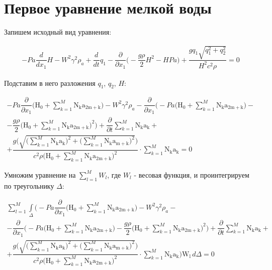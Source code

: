 \documentclass[14pt]{extreport}
\begin{document}
\section{Первое уравнение мелкой воды}

Запишем исходный вид уравнения:

\begin{multline*}
- Pa \dfrac{d}{d x_{1}} H - W^{2} \gamma^{2} \rho_{a} + \dfrac{d}{d t} q_{1} - \dfrac{\partial}{\partial x_{1}}\bigg(- \dfrac{g \rho}{2} H^{2} - H Pa\bigg) + \dfrac{g q_{1} \sqrt{q_{1}^{2} + q_{2}^{2}}}{H^{2} c^{2} \rho}=0
\end{multline*}

Подставим в него разложения $q_1$, $q_2$, $H$:

\begin{multline*}
- Pa \dfrac{\partial}{\partial x_{1}} \bigg(\operatorname{H_{0}} + \sum_{k=1}^{M} \operatorname{N_{k}} \operatorname{a_{2m+k}}\bigg) - W^{2} \gamma^{2} \rho_{a} - \dfrac{\partial}{\partial x_{1}}\bigg(- Pa \bigg(\operatorname{H_{0}} + \sum\limits_{k=1}^{M} \operatorname{N_{k}} \operatorname{a_{2m+k}}\bigg) -\\- \dfrac{g \rho}{2} \bigg(\operatorname{H_{0}} + \sum\limits_{k=1}^{M} \operatorname{N_{k}} \operatorname{a_{2m+k}}\bigg)^{2}\bigg) + \dfrac{\partial}{\partial t} \sum\limits_{k=1}^{M} \operatorname{N_{k}} \operatorname{a_{k}} +\\+ \dfrac{g \bigg(\sqrt{\bigg(\sum\limits_{k=1}^{M} \operatorname{N_{k}} \operatorname{a_{k}}\bigg)^{2} + \bigg(\sum\limits_{k=1}^{M} \operatorname{N_{k}} \operatorname{a_{m+k}}\bigg)^{2}}\bigg)}{c^{2} \rho \bigg(\operatorname{H_{0}} + \sum\limits_{k=1}^{M} \operatorname{N_{k}} \operatorname{a_{2m+k}}\bigg)^{2}} \cdot \sum\limits_{k=1}^{M} \operatorname{N_{k}} \operatorname{a_{k}} = 0
\end{multline*}

Умножим уравнение на $\sum\limits_{l=1}^{M} W_l$, где $W_l$ - весовая функция, и проинтегрируем по треугольнику $\Delta$:

\begin{multline*}
\sum_{l=1}^{M} \int\limits_{\Delta} \bigg(- Pa \dfrac{\partial}{\partial x_{1}}\bigg(\operatorname{H_{0}} + \sum_{k=1}^{M} \operatorname{N_{k}} \operatorname{a_{2m+k}}\bigg) - W^{2} \gamma^{2} \rho_{a} -\\- \dfrac{\partial}{\partial x_{1}}\bigg(- Pa \bigg(\operatorname{H_{0}} + \sum\limits_{k=1}^{M} \operatorname{N_{k}} \operatorname{a_{2m+k}}\bigg) - \dfrac{g \rho}{2} \bigg(\operatorname{H_{0}} + \sum_{k=1}^{M} \operatorname{N_{k}} \operatorname{a_{2m+k}}\bigg)^{2}\bigg) + \dfrac{\partial}{\partial t} \sum\limits_{k=1}^{M} \operatorname{N_{k}} \operatorname{a_{k}} +\\+ \dfrac{g \bigg(\sqrt{\bigg(\sum\limits_{k=1}^{M} \operatorname{N_{k}} \operatorname{a_{k}}\bigg)^{2} + \bigg(\sum\limits_{k=1}^{M} \operatorname{N_{k}} \operatorname{a_{m+k}}\bigg)^{2}}\bigg)}{c^{2} \rho \bigg(\operatorname{H_{0}} + \sum\limits_{k=1}^{M} \operatorname{N_{k}} \operatorname{a_{2m+k}}\bigg)^{2}} \cdot \sum\limits_{k=1}^{M} \operatorname{N_{k}} \operatorname{a_{k}}\bigg) \operatorname{W_{l}}\, d\Delta = 0
\end{multline*}
\end{document}
